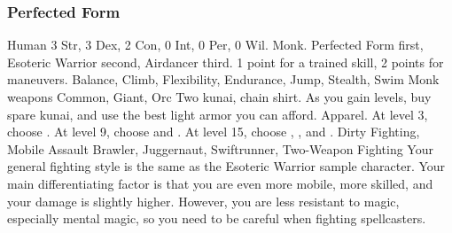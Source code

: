         \subsubsection{Perfected Form}
             Human
             3 Str, 3 Dex, 2 Con, 0 Int, 0 Per, 0 Wil.
             Monk.
             Perfected Form first, Esoteric Warrior second, Airdancer third.
             1 point for a trained skill, 2 points for maneuvers.
             Balance, Climb, Flexibility, Endurance, Jump, Stealth, Swim
             Monk weapons
             Common, Giant, Orc
             Two kunai, chain shirt. As you gain levels, buy spare kunai, and use the best light armor you can afford.
             Apparel.
                At level 3, choose .
                At level 9, choose  and .
                At level 15, choose , , and .
             Dirty Fighting, Mobile Assault
             Brawler, Juggernaut, Swiftrunner, Two-Weapon Fighting
             Your general fighting style is the same as the Esoteric Warrior sample character.
            Your main differentiating factor is that you are even more mobile, more skilled, and your damage is slightly higher.
            However, you are less resistant to magic, especially mental magic, so you need to be careful when fighting spellcasters.
